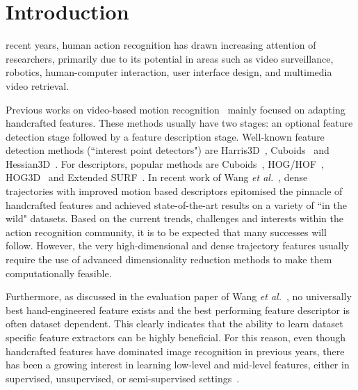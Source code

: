 

\section{Introduction}
\label{sec:introduction}

 recent years, human action recognition has drawn increasing attention of researchers, primarily due to its potential in areas such as video surveillance, robotics, human-computer interaction, user interface design, and multimedia video retrieval.

Previous works on video-based motion recognition~\cite{liuli,xiantong,diwu2} mainly focused on adapting handcrafted features. %
These methods usually have two stages: an optional feature detection stage followed by a feature description stage. Well-known feature detection methods (``interest point detectors") are Harris3D~\cite{laptev2005space}, Cuboids~\cite{dollar2005behavior} and Hessian3D~\cite{hession3d}. For descriptors, popular methods are Cuboids~\cite{scovanner20073}, HOG/HOF~\cite{laptev2005space}, HOG3D~\cite{klaser:inria-00514853} and Extended SURF~\cite{hession3d}.
In recent work of Wang \textit{et al.}~\cite{wang2013dense}, dense trajectories with improved motion based descriptors epitomised the pinnacle of handcrafted features and achieved state-of-the-art results on a variety of ``in the wild" datasets.
Based on the current trends, challenges and interests within the action recognition community, it is to be expected that many successes will follow. However, the very high-dimensional and dense trajectory features usually require the use of advanced dimensionality reduction methods to make them computationally feasible.

Furthermore, as discussed in the evaluation paper of Wang \emph{et al.}~\cite{wang2009evaluation}, no universally best hand-engineered feature exists and the best performing feature descriptor is often dataset dependent. This clearly indicates that the ability to learn dataset specific feature extractors can be highly beneficial.
For this reason, even though handcrafted features have dominated image recognition in previous years, there has been a growing interest in learning low-level and mid-level features, either in supervised, unsupervised, or semi-supervised settings~\cite{taylor2010convolutional,le2011learning,baccouche2005spatio}.



